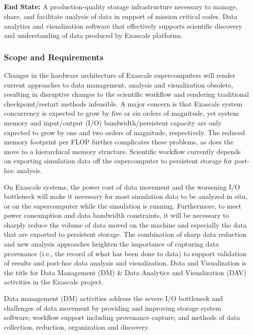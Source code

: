 \subsection{ \dataviz}\label{subsect:dataviz}

\textbf{End State:} A production-quality storage infrastructure necessary to manage, share, and facilitate analysis of data in support of mission critical codes. Data analytics and visualization software that effectively supports scientific discovery and understanding of data produced by Exascale platforms.

\subsubsection{Scope and Requirements}
Changes in the hardware architecture of Exascale supercomputers will render current approaches to data management, analysis and visualization obsolete, resulting in disruptive changes to the scientific workflow and rendering traditional checkpoint/restart methods infeasible. A major concern is that Exascale system concurrency is expected to grow by five or six orders of magnitude, yet system memory and input/output (I/O) bandwidth/persistent capacity are only expected to grow by one and two orders of magnitude, respectively. The reduced memory footprint per FLOP further complicates these problems, as does the move to a hierarchical memory structure. Scientific workflow currently depends on exporting simulation data off the supercomputer to persistent storage for post-hoc analysis.

On Exascale systems, the power cost of data movement and the worsening I/O bottleneck will make it necessary for most simulation data to be analyzed in situ, or on the supercomputer while the simulation is running. Furthermore, to meet power consumption and data bandwidth constraints, it will be necessary to sharply reduce the volume of data moved on the machine and especially the data that are exported to persistent storage. The combination of sharp data reduction and new analysis approaches heighten the importance of capturing data provenance (i.e., the record of what has been done to data) to support validation of results and post-hoc data analysis and visualization.
Data and Visualization is the title for Data Management (DM) \& Data Analytics and Visualization (DAV) activities in the Exascale project.

Data management (DM) activities address the severe I/O bottleneck and challenges of data movement by providing and improving storage system software; workflow support including provenance capture; and methods of data collection, reduction, organization and discovery.

